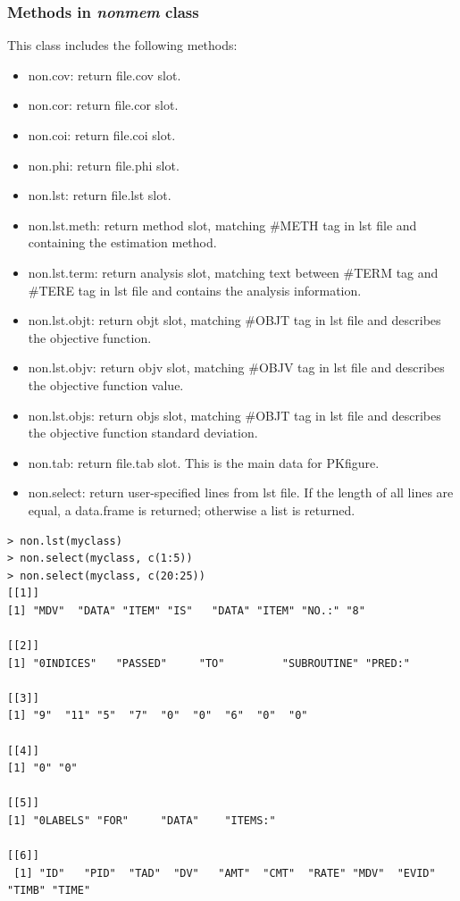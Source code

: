 \documentclass[a4paper]{article}
\begin{document}
\subsubsection{Methods in \textit{nonmem} class}
This class includes the following methods:
\begin{itemize}
	\item non.cov: return file.cov slot.
	\item non.cor: return file.cor slot. 
	\item non.coi: return file.coi slot.
	\item non.phi: return file.phi slot.
\item non.lst: return file.lst slot.
\item non.lst.meth: return method slot, matching \#METH tag in lst file and containing the estimation method.
\item non.lst.term: return analysis slot, matching text between \#TERM tag and \#TERE tag in lst file and contains the analysis information.
	\item non.lst.objt: return objt slot, matching \#OBJT tag in lst file and describes the objective function.
	\item non.lst.objv: return objv slot, matching \#OBJV tag in lst file and describes the objective function value.
	\item non.lst.objs: return objs slot, matching \#OBJT tag in lst file and describes the objective function standard deviation.
\item non.tab: return file.tab slot. This is the main data for PKfigure.
\item non.select: return user-specified lines from lst file. If the length of all lines are equal,
	a data.frame is returned; otherwise a list is returned.
\end{itemize}

\begin{verbatim}
> non.lst(myclass)
> non.select(myclass, c(1:5))
> non.select(myclass, c(20:25))
[[1]]
[1] "MDV"  "DATA" "ITEM" "IS"   "DATA" "ITEM" "NO.:" "8"   

[[2]]
[1] "0INDICES"   "PASSED"     "TO"         "SUBROUTINE" "PRED:"     

[[3]]
[1] "9"  "11" "5"  "7"  "0"  "0"  "6"  "0"  "0" 

[[4]]
[1] "0" "0"

[[5]]
[1] "0LABELS" "FOR"     "DATA"    "ITEMS:" 

[[6]]
 [1] "ID"   "PID"  "TAD"  "DV"   "AMT"  "CMT"  "RATE" "MDV"  "EVID" "TIMB" "TIME"
\end{verbatim}
\end{document}
